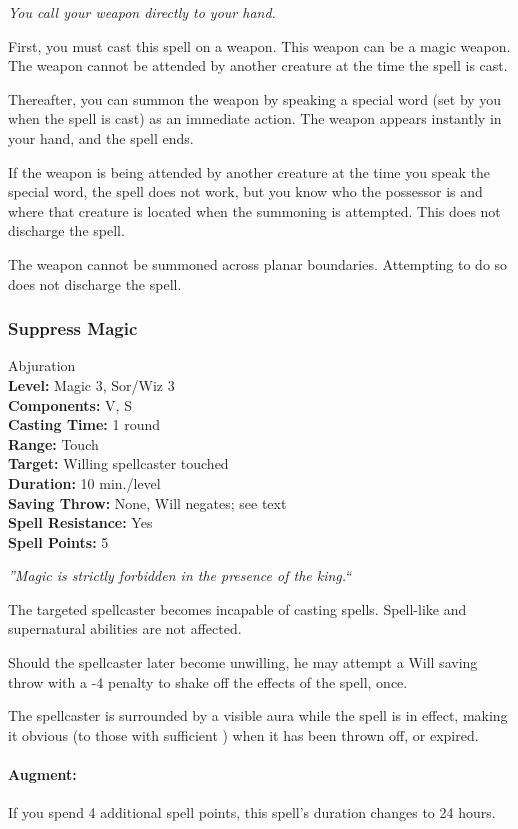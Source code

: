 \emph{You call your weapon directly to your hand.}

First, you must cast this spell on a weapon. This weapon can be a magic weapon.
The weapon cannot be attended by another creature at the time the spell is cast.

Thereafter, you can summon the weapon by speaking a special word (set by you when the spell is cast) as an immediate action. 
The weapon appears instantly in your hand, and the spell ends.

If the weapon is being attended by another creature at the time you speak the special word, the spell does not work, 
but you know who the possessor is and where that creature is located when the summoning is attempted.
This does not discharge the spell.

The weapon cannot be summoned across planar boundaries.
Attempting to do so does not discharge the spell.
\subsubsection{Suppress Magic}
\label{Spell:SuppressMagic}
Abjuration
\\ \textbf{Level:} Magic 3, Sor/Wiz 3
\\ \textbf{Components:} V, S
\\ \textbf{Casting Time:} 1 round
\\ \textbf{Range:} Touch
\\ \textbf{Target:} Willing spellcaster touched
\\ \textbf{Duration:} 10 min./level
\\ \textbf{Saving Throw:} None, Will negates; see text
\\ \textbf{Spell Resistance:} Yes
\\ \textbf{Spell Points:} 5

\emph{''Magic is strictly forbidden in the presence of the king.``}

The targeted spellcaster becomes incapable of casting spells. Spell-like and supernatural abilities are not affected.

Should the spellcaster later become unwilling, he may attempt a Will saving throw with a -4 penalty to shake off the effects of the spell, once.

The spellcaster is surrounded by a visible aura while the spell is in effect, making it obvious (to those with sufficient ) when it has been thrown off, or expired.

\paragraph{Augment:} If you spend 4 additional spell points, this spell's duration changes to 24 hours.
